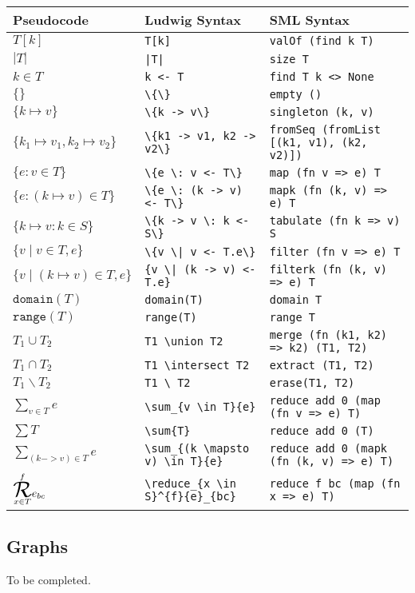 \begin{tabular}{| l l l |}
\hline
\textbf{Pseudocode} & \textbf{Ludwig Syntax} & \textbf{SML Syntax}\\
\hline
$T[k]$ & \verb"T[k]" & \verb"valOf (find k T)"\\
$|T|$ & \verb"|T|" & \verb"size T"\\
$k \in T$ & \verb"k <- T" & \verb"find T k <> None"\\
$\{\}$ & \verb"\{\}" & \verb"empty ()"\\
$\{k \mapsto v\}$ & \verb"\{k -> v\}" & \verb"singleton (k, v)"\\
$\{k_1 \mapsto v_1, k_2 \mapsto v_2\}$ & \verb"\{k1 -> v1, k2 -> v2\}" & \verb"fromSeq (fromList [(k1, v1), (k2, v2)])"\\
$\{e : v \in T\}$ & \verb"\{e \: v <- T\}" & \verb"map (fn v => e) T"\\
$\{e : (k \mapsto v) \in T\}$ & \verb"\{e \: (k -> v) <- T\}" & \verb"mapk (fn (k, v) => e) T"\\
$\{k \mapsto v : k \in S\}$ & \verb"\{k -> v \: k <- S\}" & \verb"tabulate (fn k => v) S"\\
$\{v \mid v \in T, e\}$ & \verb"\{v \| v <- T.e\}" & \verb"filter (fn v => e) T"\\
$\{v \mid (k \mapsto v) \in T, e\}$ & \verb"{v \| (k -> v) <- T.e}" & \verb"filterk (fn (k, v) => e) T"\\
$\texttt{domain}(T)$ & \verb"domain(T)" & \verb"domain T"\\
$\texttt{range}(T)$ & \verb"range(T)" & \verb"range T"\\
$T_1 \cup T_2$ & \verb"T1 \union T2" & \verb"merge (fn (k1, k2) => k2) (T1, T2)"\\
$T_1 \cap T_2$ & \verb"T1 \intersect T2" & \verb"extract (T1, T2)"\\
$T_1 \backslash T_2$ & \verb"T1 \ T2" & \verb"erase(T1, T2)"\\
$\displaystyle \sum_{v \in T}{e}$ & \verb"\sum_{v \in T}{e}" & \verb"reduce add 0 (map (fn v => e) T)"\\
$\displaystyle \sum{T}$ & \verb"\sum{T}" & \verb"reduce add 0 (T)"\\
$\displaystyle \sum_{(k -> v) \in T}{e}$ & \verb"\sum_{(k \mapsto v) \in T}{e}" & \verb"reduce add 0 (mapk (fn (k, v) => e) T)"\\
$\overset{f}{\underset{x \in T}{\reduce}}{e}_{bc}$ & \verb"\reduce_{x \in S}^{f}{e}_{bc}" & \verb"reduce f bc (map (fn x => e) T)"\\
\hline
\end{tabular}

\subsection{Graphs}

To be completed.

